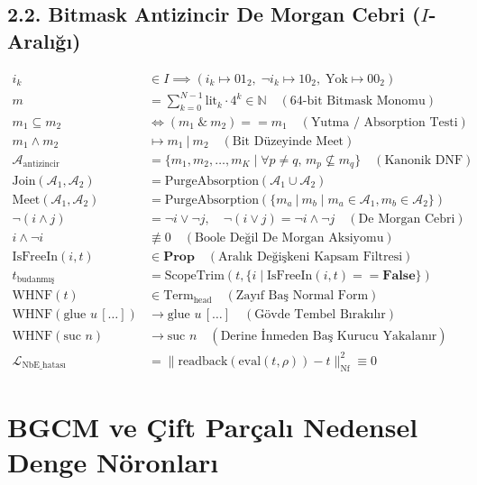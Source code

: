 \documentclass[11pt, a4paper]{article}
\begin{document}
\subsection{2.2. Bitmask Antizincir De Morgan Cebri ($I$-Aralığı)}
\begin{align}
i_k &\in I \implies (i_k \mapsto 01_2, \; \neg i_k \mapsto 10_2, \; \text{Yok} \mapsto 00_2) \\
m &= \sum_{k=0}^{N-1} \text{lit}_k \cdot 4^k \in \mathbb{N} \quad (\text{64-bit Bitmask Monomu}) \\
m_1 \subseteq m_2 &\iff (m_1 \ \& \ m_2) == m_1 \quad (\text{Yutma / Absorption Testi}) \\
m_1 \wedge m_2 &\mapsto m_1 \ | \ m_2 \quad (\text{Bit Düzeyinde Meet}) \\
\mathcal{A}_{\text{antizincir}} &= \{ m_1, m_2, \dots, m_K \mid \forall p \ne q, \, m_p \not\subseteq m_q \} \quad (\text{Kanonik DNF}) \\
\text{Join}(\mathcal{A}_1, \mathcal{A}_2) &= \text{PurgeAbsorption}(\mathcal{A}_1 \cup \mathcal{A}_2) \\
\text{Meet}(\mathcal{A}_1, \mathcal{A}_2) &= \text{PurgeAbsorption}(\{ m_a \ | \ m_b \mid m_a \in \mathcal{A}_1, m_b \in \mathcal{A}_2 \}) \\
\neg (i \wedge j) &= \neg i \vee \neg j, \quad \neg (i \vee j) = \neg i \wedge \neg j \quad (\text{De Morgan Cebri}) \\
i \wedge \neg i &\not\equiv 0 \quad (\text{Boole Değil De Morgan Aksiyomu}) \\
\text{IsFreeIn}(i, t) &\in \mathbf{Prop} \quad (\text{Aralık Değişkeni Kapsam Filtresi}) \\
t_{\text{budanmış}} &= \text{ScopeTrim}(t, \{i \mid \text{IsFreeIn}(i, t) == \mathbf{False}\}) \\
\text{WHNF}(t) &\in \text{Term}_{\text{head}} \quad (\text{Zayıf Baş Normal Form}) \\
\text{WHNF}(\text{glue } u \, [\dots]) &\longrightarrow \text{glue } u \, [\dots] \quad (\text{Gövde Tembel Bırakılır}) \\
\text{WHNF}(\text{suc } n) &\longrightarrow \text{suc } n \quad (\text{Derine İnmeden Baş Kurucu Yakalanır}) \\
\mathcal{L}_{\text{NbE\_hatası}} &= \| \text{readback}(\text{eval}(t, \rho)) - t \|_{\text{Nf}}^2 \equiv 0
\end{align}

\section{BGCM ve Çift Parçalı Nedensel Denge Nöronları}
\end{document}
